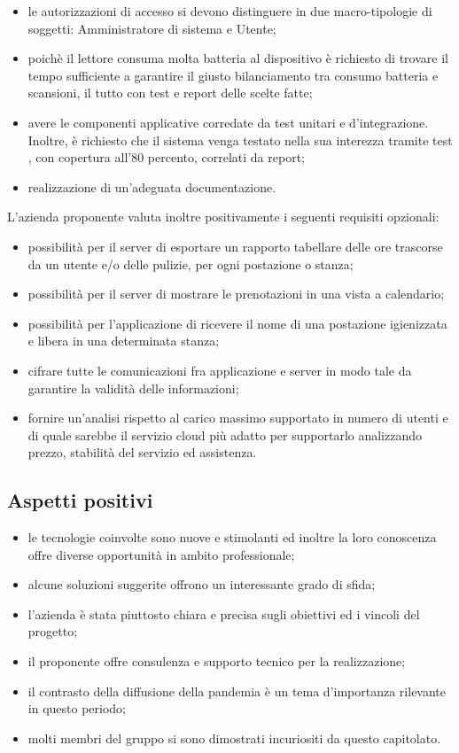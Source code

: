 \begin{itemize}
\item le autorizzazioni di accesso si devono distinguere in due macro-tipologie di soggetti: Amministratore di sistema e Utente;
\item poichè il lettore  consuma molta batteria al dispositivo è richiesto di trovare il tempo sufficiente a garantire il giusto bilanciamento tra consumo batteria e scansioni, il tutto con test e report delle scelte fatte;
\item avere le componenti applicative corredate da test unitari e d’integrazione. Inoltre, è richiesto che il sistema venga testato nella sua interezza tramite test , con copertura all'80 percento, correlati da report;
\item realizzazione di un'adeguata documentazione.
\end{itemize}

L’azienda proponente valuta inoltre positivamente i seguenti requisiti opzionali:
\begin{itemize}    
\item possibilità per il server di esportare un rapporto tabellare delle ore trascorse da un utente e/o delle pulizie, per ogni postazione o stanza;
\item possibilità per il server di mostrare le prenotazioni in una vista a calendario;
\item possibilità per l'applicazione di ricevere il nome di una postazione igienizzata e libera in una determinata stanza; 
\item cifrare tutte le comunicazioni fra applicazione e server in modo tale da garantire la validità delle informazioni;
\item fornire un’analisi rispetto al carico massimo supportato in numero di utenti e di quale sarebbe il servizio cloud più adatto per supportarlo analizzando prezzo, stabilità  del servizio ed assistenza.
\end{itemize}

\subsection{Aspetti positivi}
\begin{itemize}
\item le tecnologie coinvolte sono nuove e stimolanti ed inoltre la loro conoscenza offre diverse opportunità in ambito professionale;
\item alcune soluzioni suggerite offrono un interessante grado di sfida;
\item l'azienda è stata piuttosto chiara e precisa sugli obiettivi ed i vincoli del progetto;
\item il proponente offre consulenza e supporto tecnico per la realizzazione;
\item il contrasto della diffusione della pandemia è un tema d'importanza rilevante in questo periodo;
\item molti membri del gruppo si sono dimostrati incuriositi da questo capitolato.

\end{itemize}

